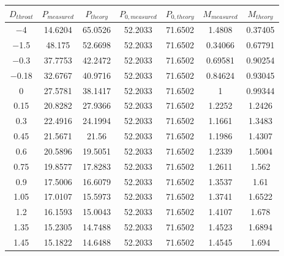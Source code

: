 \begin{tabular}{ccccccc}
\toprule
$D_{throat}$ & $P_{measured}$ & $P_{theory}$ & $P_{0,measured}$ & $P_{0,theory}$ & $M_{measured}$ & $M_{theory}$ \\
\midrule
\num{-4} & \num{14.6204} & \num{65.0526} & \num{52.2033} & \num{71.6502} & \num{1.4808} & \num{0.37405} \\ 
\num{-1.5} & \num{48.175} & \num{52.6698} & \num{52.2033} & \num{71.6502} & \num{0.34066} & \num{0.67791} \\ 
\num{-0.3} & \num{37.7753} & \num{42.2472} & \num{52.2033} & \num{71.6502} & \num{0.69581} & \num{0.90254} \\ 
\num{-0.18} & \num{32.6767} & \num{40.9716} & \num{52.2033} & \num{71.6502} & \num{0.84624} & \num{0.93045} \\ 
\num{0} & \num{27.5781} & \num{38.1417} & \num{52.2033} & \num{71.6502} & \num{1} & \num{0.99344} \\ 
\num{0.15} & \num{20.8282} & \num{27.9366} & \num{52.2033} & \num{71.6502} & \num{1.2252} & \num{1.2426} \\ 
\num{0.3} & \num{22.4916} & \num{24.1994} & \num{52.2033} & \num{71.6502} & \num{1.1661} & \num{1.3483} \\ 
\num{0.45} & \num{21.5671} & \num{21.56} & \num{52.2033} & \num{71.6502} & \num{1.1986} & \num{1.4307} \\ 
\num{0.6} & \num{20.5896} & \num{19.5051} & \num{52.2033} & \num{71.6502} & \num{1.2339} & \num{1.5004} \\ 
\num{0.75} & \num{19.8577} & \num{17.8283} & \num{52.2033} & \num{71.6502} & \num{1.2611} & \num{1.562} \\ 
\num{0.9} & \num{17.5006} & \num{16.6079} & \num{52.2033} & \num{71.6502} & \num{1.3537} & \num{1.61} \\ 
\num{1.05} & \num{17.0107} & \num{15.5973} & \num{52.2033} & \num{71.6502} & \num{1.3741} & \num{1.6522} \\ 
\num{1.2} & \num{16.1593} & \num{15.0043} & \num{52.2033} & \num{71.6502} & \num{1.4107} & \num{1.678} \\ 
\num{1.35} & \num{15.2305} & \num{14.7488} & \num{52.2033} & \num{71.6502} & \num{1.4523} & \num{1.6894} \\ 
\num{1.45} & \num{15.1822} & \num{14.6488} & \num{52.2033} & \num{71.6502} & \num{1.4545} & \num{1.694} \\ 
\bottomrule
\end{tabular}